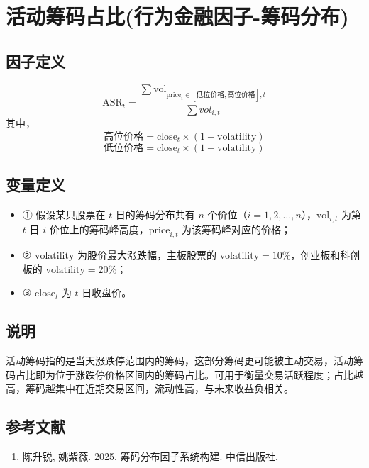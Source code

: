 \documentclass{article}
\begin{document}
\section{活动筹码占比(行为金融因子-筹码分布)}

\subsection{因子定义}
\begin{equation}
    \mathrm{ASR}_t = \frac{\sum \mathrm{vol}_{\mathrm{price}_i \in [\text{低位价格}, \text{高位价格}],t}}{\sum vol_{i,t}}
\end{equation}
其中，
\begin{equation}
    \text{高位价格} = \mathrm{close}_t \times (1 + \mathrm{volatility})
\end{equation}
\begin{equation}
    \text{低位价格} = \mathrm{close}_t \times (1 - \mathrm{volatility})
\end{equation}

\subsection{变量定义}
\begin{itemize}
    \item ① 假设某只股票在 \( t \) 日的筹码分布共有 \( n \) 个价位（\( i = 1, 2, \ldots, n \)），\( \mathrm{vol}_{i,t} \) 为第 \( t \) 日 \( i \) 价位上的筹码峰高度，\( \mathrm{price}_{i,t} \) 为该筹码峰对应的价格；
    \item ② \( \mathrm{volatility} \) 为股价最大涨跌幅，主板股票的 \( \mathrm{volatility} = 10\% \)，创业板和科创板的 \( \mathrm{volatility} = 20\% \)；
    \item ③ \( \mathrm{close}_t \) 为 \( t \) 日收盘价。
\end{itemize}

\subsection{说明}
活动筹码指的是当天涨跌停范围内的筹码，这部分筹码更可能被主动交易，活动筹码占比即为位于涨跌停价格区间内的筹码占比。可用于衡量交易活跃程度；占比越高，筹码越集中在近期交易区间，流动性高，与未来收益负相关。

\subsection{参考文献}
\begin{enumerate}
    \item 陈升锐, 姚紫薇. 2025. 筹码分布因子系统构建. 中信出版社.
\end{enumerate}
\end{document}
